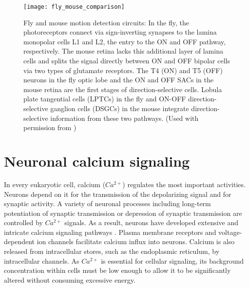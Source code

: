 \begin{figure}
\centering
\hspace*{-1cm} 
\texttt{[image: fly\_mouse\_comparison]}
\caption[Fly and mouse motion detection circuits] {Fly and mouse motion detection circuits: In the fly, the photoreceptors connect via sign-inverting synapses to the lamina monopolar cells L1 and L2, the entry to the ON and OFF pathway, respectively. The mouse retina lacks this additional layer of lamina cells and splits the signal directly between ON and OFF bipolar cells via two types of glutamate receptors. The T4 (ON) and T5 (OFF) neurons in the fly optic lobe and the ON and OFF SACs in the mouse retina are the first stages of direction-selective cells. Lobula plate tangential cells (LPTCs) in the fly and ON-OFF direction-selective ganglion cells (DSGCs) in the mouse integrate direction-selective information from these two pathways. (Used with permission from \cite{Borst2015})} 
\label{fig:flymouse}
\end{figure}


\section{Neuronal calcium signaling}
In every eukaryotic cell, calcium ($Ca^{2+}$) regulates the most important activities. Neurons depend on it for the transmission of the depolarizing signal and for synaptic activity. A variety of neuronal processes including long-term potentiation of synaptic transmission or depression of synaptic transmission are controlled by $Ca^{2+}$ signals. As a result, neurons have developed extensive and intricate calcium signaling pathways \parencite{Brini2014}. Plasma membrane receptors and voltage-dependent ion channels facilitate calcium influx into neurons. Calcium is also released from intracellular stores, such as the endoplasmic reticulum, by intracellular channels. As $Ca^{2+}$ is essential for cellular signaling, its background concentration within cells must be low enough to allow it to be significantly altered without consuming excessive energy. %

